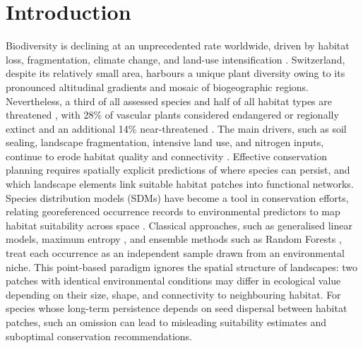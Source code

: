 \section{Introduction}
\label{sec:introduction}

Biodiversity is declining at an unprecedented rate worldwide, driven by habitat 
loss, fragmentation, climate change, and land-use intensification \citep{IPBES2019}. 
Switzerland, despite its relatively small area, harbours a unique plant 
diversity owing to its pronounced altitudinal gradients and mosaic of biogeographic 
regions. Nevertheless, a third of all assessed species and half of all habitat 
types are threatened \citep{FOEN2022}, with 28\% of vascular plants considered 
endangered or regionally extinct and an additional 14\% near-threatened 
\citep{InfoFlora2016}. The main drivers, such as soil sealing, landscape fragmentation, 
intensive land use, and nitrogen inputs, continue to erode habitat quality and 
connectivity \citep{FOEN2022,FOEN2025}. Effective conservation planning requires 
spatially explicit predictions of where species can persist, and which 
landscape elements link suitable habitat patches into functional networks.
Species distribution models (SDMs) have become a tool in conservation efforts,
relating georeferenced occurrence records to environmental 
predictors to map habitat suitability across space \citep{Elith2009,Guisan2005}. 
Classical approaches, such as generalised linear models, maximum entropy \citep{Phillips2006}, 
and ensemble methods such as Random Forests \citep{Breiman2001}, treat each 
occurrence as an independent sample drawn from an environmental niche. This 
point-based paradigm ignores the spatial structure of landscapes: two 
patches with identical environmental conditions may differ in 
ecological value depending on their size, shape, and connectivity to neighbouring 
habitat. For species whose long-term persistence depends on seed dispersal between 
habitat patches, such an omission can lead to 
misleading suitability estimates and suboptimal conservation recommendations.

